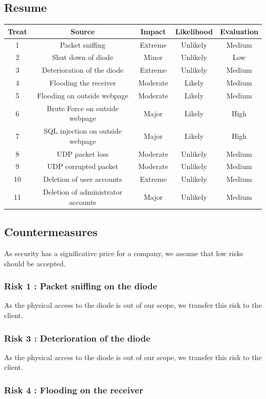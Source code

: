 \documentclass[a4paper,11pt]{article}
\begin{document}
\subsection{Resume}
\begin{tabular}{|c|c|c|c|c|}
\hline
Treat & Source & Impact& Likelihood & Evaluation \\
\hline
1 &  Packet sniffing & Extreme  & Unlikely & Medium\\
\hline
2 & Shut down of diode & Minor & Unlikely & Low \\
\hline
3 & Deterioration of the diode & Extreme & Unlikely & Medium\\
\hline
4 & Flooding the receiver & Moderate & Likely & Medium\\
\hline
5 & Flooding on outside webpage & Moderate & Likely & Medium \\
\hline 
6 &  Brute Force on outside webpage & Major & Likely & High\\
\hline
7 & SQL injection on outside webpage & Major & Likely & High \\
\hline
8 & UDP packet loss & Moderate & Unlikely & Medium \\
\hline
9 & UDP corrupted packet & Moderate & Unlikely & Medium \\
\hline
10 & Deletion of user accounts & Extreme & Unlikely & Medium \\
\hline
11 & Deletion of administrator accounts & Major & Unlikely & Medium \\
\hline
  
\end{tabular}
\subsection{Countermeasures}
As security has a significative price for a company, we assume that low risks should be accepted.
\subsubsection{Risk 1 : Packet sniffing on the diode}
As the physical access to the diode is out of our scope, we transfer this risk to the client.
\subsubsection{Risk 3 : Deterioration of the diode}
As the physical access to the diode is out of our scope, we transfer this risk to the client.
\subsubsection{Risk 4 : Flooding on the receiver}
\end{document}
